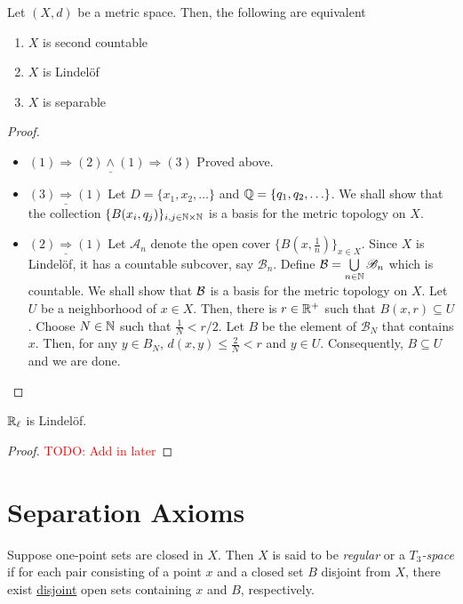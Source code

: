 \begin{theorem}
    Let $(X,d)$ be a metric space. Then, the following are equivalent
    \begin{enumerate}
        \item $X$ is second countable 
        \item $X$ is Lindel\"of
        \item $X$ is separable
    \end{enumerate}
\end{theorem}
\begin{proof}
\hfill 
\begin{itemize}
    \item \noindent$\underline{(1)\Longrightarrow(2)\wedge(1)\Longrightarrow(3)}$ Proved above.

    \item \noindent$\underline{(3)\Longrightarrow(1)}$ Let $D = \{x_1,x_2,\ldots\}$ and $\mathbb{Q} = \{q_1,q_2,\ldots\}$. We shall show that the collection $\{B(x_i, q_j)\}_{i,j\in\mathbb{N}\times\mathbb{N}}$ is a basis for the metric topology on $X$.

    \item \noindent$\underline{(2)\Longrightarrow(1)}$ Let $\mathscr A_n$ denote the open cover $\{B(x,\frac{1}{n})\}_{x\in X}$. Since $X$ is Lindel\"of, it has a countable subcover, say $\mathscr B_n$. Define $\mathcal{B} = \bigcup\limits_{n\in\mathbb{N}}\mathscr B_n$ which is countable. We shall show that $\mathcal{B}$ is a basis for the metric topology on $X$. Let $U$ be a neighborhood of $x\in X$. Then, there is $r\in\mathbb{R}^+$ such that $B(x,r)\subseteq U$. Choose $N\in\mathbb{N}$ such that $\frac{1}{N} < r/2$. Let $B$ be the element of $\mathscr B_N$ that contains $x$. Then, for any $y\in B_N$, $d(x,y)\le\frac{2}{N} < r$ and $y\in U$. Consequently, $B\subseteq U$ and we are done.
\end{itemize}
\end{proof}

\begin{proposition}
    $\mathbb{R}_\ell$ is Lindel\"of.
\end{proposition}
\begin{proof}
    \textcolor{red}{TODO: Add in later}
\end{proof}

\section{Separation Axioms}

\begin{definition}
    Suppose one-point sets are closed in $X$. Then $X$ is said to be \textit{regular} or a \textit{$T_3$-space} if for each pair consisting of a point $x$ and a closed set $B$ disjoint from $X$, there exist \underline{disjoint} open sets containing $x$ and $B$, respectively.
\end{definition}


